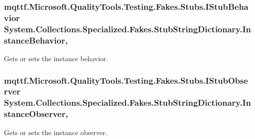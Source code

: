 \hypertarget{class_system_1_1_collections_1_1_specialized_1_1_fakes_1_1_stub_string_dictionary_a95fba2c59f29b288382f44efa4178b99}{
\subsubsection[{Instance\-Behavior}]{\setlength{\rightskip}{0pt plus 5cm}mqttf.\-Microsoft.\-Quality\-Tools.\-Testing.\-Fakes.\-Stubs.\-I\-Stub\-Behavior System.\-Collections.\-Specialized.\-Fakes.\-Stub\-String\-Dictionary.\-Instance\-Behavior\hspace{0.3cm}{\ttfamily [get]}, {\ttfamily [set]}}}\label{class_system_1_1_collections_1_1_specialized_1_1_fakes_1_1_stub_string_dictionary_a95fba2c59f29b288382f44efa4178b99}


Gets or sets the instance behavior.

\hypertarget{class_system_1_1_collections_1_1_specialized_1_1_fakes_1_1_stub_string_dictionary_a23d69e87f699e08c1e2f89f2b3b5436a}{
\subsubsection[{Instance\-Observer}]{\setlength{\rightskip}{0pt plus 5cm}mqttf.\-Microsoft.\-Quality\-Tools.\-Testing.\-Fakes.\-Stubs.\-I\-Stub\-Observer System.\-Collections.\-Specialized.\-Fakes.\-Stub\-String\-Dictionary.\-Instance\-Observer\hspace{0.3cm}{\ttfamily [get]}, {\ttfamily [set]}}}\label{class_system_1_1_collections_1_1_specialized_1_1_fakes_1_1_stub_string_dictionary_a23d69e87f699e08c1e2f89f2b3b5436a}


Gets or sets the instance observer.

